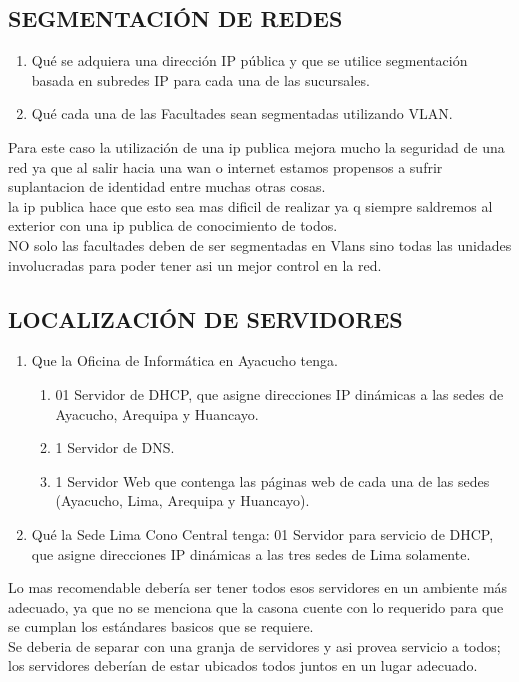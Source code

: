 \subsection{SEGMENTACI\'ON DE REDES}
\begin{definicion}[]
{
\begin{enumerate}[label=\itembolasazules{}]
\item Qu\'e se adquiera una direcci\'on IP p\'ublica y que se utilice
segmentaci\'on basada en subredes IP para cada una de las sucursales.
\item Qu\'e cada una de las Facultades sean segmentadas utilizando VLAN.
\end{enumerate}
}
\end{definicion}
Para este caso la utilizaci\'on de una ip publica mejora mucho la seguridad de una red ya que al salir hacia una wan o internet estamos propensos a sufrir suplantacion de identidad entre muchas otras cosas.
\\
la ip publica hace que esto sea mas dificil de realizar ya q siempre saldremos al exterior con una ip publica de conocimiento de todos.\\

NO solo las facultades deben de ser segmentadas en Vlans sino todas las unidades involucradas para poder tener asi un mejor control en la red.
\subsection{LOCALIZACI\'ON DE SERVIDORES}
\begin{definicion}[]
{
\begin{enumerate}[label=\itembolasazules{}]
\item Que la Oficina de Inform\'atica en Ayacucho tenga.

\begin{enumerate}[label=\itembolas{}]
\item 01 Servidor de DHCP, que asigne direcciones IP din\'amicas a las
sedes de Ayacucho, Arequipa y Huancayo.
\item 1 Servidor de DNS.
\item 1 Servidor Web que contenga las p\'aginas web de cada una de las
sedes (Ayacucho, Lima, Arequipa y Huancayo).
\end{enumerate}

\item Qu\'e la Sede Lima Cono Central tenga: 01 Servidor para servicio de DHCP, que asigne direcciones IP
din\'amicas a las tres sedes de Lima solamente.
\end{enumerate}
}

\end{definicion}
Lo mas recomendable deber\'ia ser tener todos esos servidores en un ambiente m\'as adecuado, ya que no se menciona que la casona cuente con lo requerido para que se cumplan los est\'andares basicos que se requiere.
\\
Se deberia de separar con una granja de servidores y asi provea servicio a todos; los servidores deber\'ian de estar ubicados todos juntos en un lugar adecuado.

